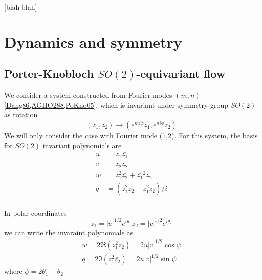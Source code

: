 \documentclass{article}
\begin{document}

 [blah blah]

\section{Dynamics and symmetry}
\label{s:symm}

\subsection{Porter-Knobloch $SO(2)$-equivariant flow}
\label{s:twoMode}

We consider a system constructed from Fourier modes $(m,n)$\ref{Dang86,AGHO288,PoKno05}, which is invariant under symmetry group $SO(2)$ as rotation
\begin{equation}
(z_1,z_2)\to(e^{mi\phi}z_1,e^{ni\phi}z_2)\label{Dang86(1.1)aa}
\end{equation}
We will only consider the case with Fourier mode (1,2). For this system, the basis for $SO(2)$ invariant polynomials are
\begin{align}
u&=z_1\bar{z_1}\\
v&=z_2\bar{z_2}\\
w&=z_1^2\bar{z_2}+\bar{z_1}^2z_2\\
q&=(z_1^2\bar{z_2}-\bar{z_1^2}z_2)/i\\
\label{Dang86(1.2)PK}
\end{align}

In polar coordinates
\begin{equation}
z_1=|u|^{1/2}e^{i\theta_1}
z_2=|v|^{1/2}e^{i\theta_2}
\end{equation}
we can write the invaraint polynomials as
\begin{align}
w=2\Re(z_1^2\bar{z_2})=2u|v|^{1/2}\cos\psi\\
q=2\Im(z_1^2\bar{z_2})=2u|v|^{1/2}\sin\psi
\label{Dang86(1.2)polar}
\end{align}
where $\psi=2\theta_1-\theta_2$
\end{document}
